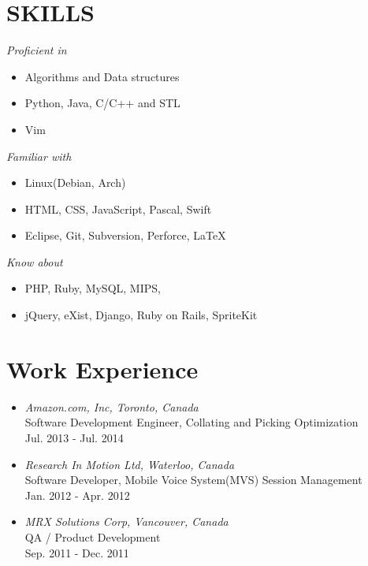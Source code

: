 \documentclass[line,margin]{res}
\begin{document}
\address{+1-647-970-3661,   owen200104@gmail.com}
\address{404\#105 The Queensway, Toronto Canada, M6S 5B5}
\begin{resume}
\section{SKILLS} 
	{\sl Proficient in } 
						\begin{itemize}
						\item Algorithms and Data structures
						\item Python, Java,  C/C++ and STL
						\item Vim
						\end{itemize}
    {\sl Familiar with }
						\begin{itemize}
						\item Linux(Debian, Arch)
						\item HTML, CSS, JavaScript, Pascal, Swift
						\item Eclipse, Git, Subversion, Perforce, \LaTeX
						\end{itemize}
 	{\sl Know about } 
					\begin{itemize}
					\item PHP, Ruby, MySQL, MIPS, 	
					\item jQuery, eXist, Django, Ruby on Rails, SpriteKit
					\end{itemize}

\section{Work Experience}
\begin{itemize}
\item {\sl Amazon.com, Inc, Toronto, Canada}\\
	Software Development Engineer, Collating and Picking Optimization \\
Jul. 2013 - Jul. 2014
\item {\sl Research In Motion Ltd, Waterloo, Canada}\\
	Software Developer, Mobile Voice System(MVS) Session Management \\
Jan. 2012 - Apr. 2012
\item {\sl MRX Solutions Corp, Vancouver, Canada}\\
 QA / Product Development \\
Sep. 2011 - Dec. 2011
\end{itemize}



\end{resume}
\end{document}

